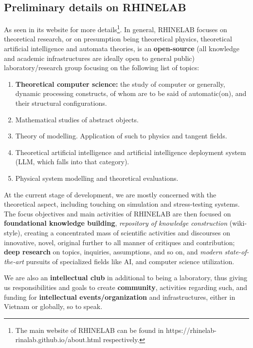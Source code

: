 \documentclass[10pt,a4paper]{article}
\begin{document}
\subsection{Preliminary details on RHINELAB}

As seen in its website for more details\footnote{The main website of RHINELAB can be found in https://rhinelab-rinalab.github.io/about.html respectively.}. In general, RHINELAB focuses on theoretical research, or on presumption being theoretical physics, theoretical artificial intelligence and automata theories, is an \textbf{open-source} (all knowledge and academic infrastructures are ideally open to general public) laboratory/research group focusing on the following list of topics:
\begin{enumerate}[topsep=0pt,itemsep=0pt]
    \item \textbf{Theoretical computer science:} the study of computer or generally, dynamic processing constructs, of whom are to be said of automatic(on), and their structural configurations.
    \item Mathematical studies of abstract objects.
    \item Theory of modelling. Application of such to physics and tangent fields. 
    \item Theoretical artificial intelligence and artificial intelligence deployment system (LLM, which falls into that category).
    \item Physical system modelling and theoretical evaluations.
\end{enumerate}

At the current stage of development, we are mostly concerned with the theoretical aspect, including touching on simulation and stress-testing systems. The focus objectives and main activities of RHINELAB are then focused on \textbf{foundational knowledge building}, \textit{repository of knowledge construction} (wiki-style), creating a concentrated mass of scientific activities and discourses on innovative, novel, original further to all manner of critiques and contribution; \textbf{deep research} on topics, inquiries, assumptions, and so on, and \textit{modern state-of-the-art} pursuits of specialized fields like AI, and computer science utilization. 

We are also an \textbf{intellectual club} in additional to being a laboratory, thus giving us responsibilities and goals to create \textbf{community}, activities regarding such, and funding for \textbf{intellectual events/organization} and infrastructures, either in Vietnam or globally, so to speak. 
\end{document}
